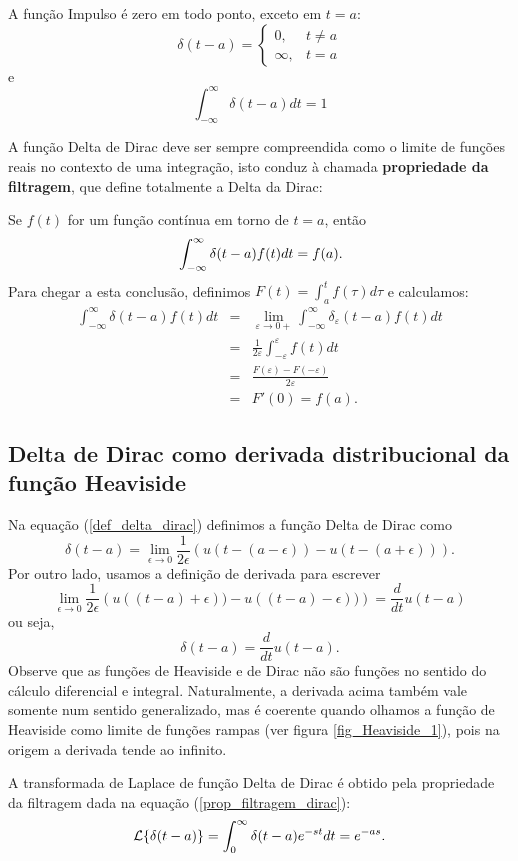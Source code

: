 A função Impulso é zero em todo ponto, exceto em $t=a$:
$$
\delta(t-a)=\left\{\begin{array}{ll}0,&t\neq a\\\infty,&t=a  \end{array}\right.
$$
e
$$
\int_{-\infty}^\infty\delta(t-a)dt=1
$$

A função Delta de Dirac deve ser sempre compreendida como o limite de funções reais no contexto de uma integração, isto conduz à chamada  {\bf propriedade da filtragem}, que define totalmente a Delta da Dirac:

Se $f(t)$ for um função contínua em torno de $t=a$, então
\begin{equation}{\label{prop_filtragem_dirac}}
\int_{-\infty}^\infty \delta(t-a)f(t)dt=f(a). 
\end{equation}
Para chegar a esta conclusão, definimos $F(t)=\int_a^t f(\tau)d\tau$ e calculamos:
\begin{eqnarray*}
\int_{-\infty}^\infty \delta(t-a)f(t)dt&=&\lim_{\varepsilon\to 0+}
\int_{-\infty}^\infty \delta_\varepsilon(t-a)f(t)dt\\
&=&\frac{1}{2\varepsilon}\int_{-\varepsilon}^\varepsilon f(t)dt\\
&=&\frac{F(\varepsilon)-F(-\varepsilon)}{2\varepsilon}\\
&=&F'(0)=f(a).
\end{eqnarray*}

\subsection{Delta de Dirac como derivada distribucional da função Heaviside}
Na equação (\ref{def_delta_dirac}) definimos a função Delta de Dirac como
$$
\delta(t-a)=\lim_{\epsilon\to 0}\frac{1}{2\epsilon}\left(u(t-(a-\epsilon))-u(t-(a+\epsilon))\right).
$$
Por outro lado, usamos a definição de derivada para escrever
$$
\lim_{\epsilon\to 0}\frac{1}{2\epsilon}\left(u((t-a)+\epsilon))-u((t-a)-\epsilon))\right)=\frac{d}{dt}u(t-a)
$$
ou seja,
$$
\delta(t-a)=\frac{d}{dt}u(t-a).
$$
Observe que as funções de Heaviside e de Dirac não são funções no sentido do cálculo diferencial e integral. Naturalmente, a derivada acima também vale somente num sentido generalizado, mas é coerente quando olhamos a função de Heaviside como limite de funções rampas (ver figura \ref{fig_Heaviside_1}), pois na origem a derivada tende ao infinito.

A transformada de Laplace de função Delta de Dirac é obtido pela propriedade da filtragem dada na equação (\ref{prop_filtragem_dirac}):
\begin{equation}{\label{prop_trans_delta_dirac}}
\mathcal{L}\{\delta(t-a)\}=\int_0^\infty \delta(t-a)e^{-st}dt=e^{-as}.
\end{equation}

